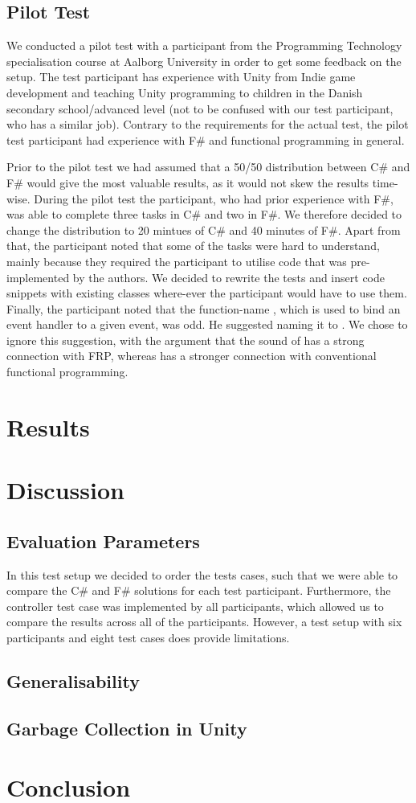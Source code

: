 \subsection{Pilot Test}
We conducted a pilot test with a participant from the Programming Technology specialisation course at Aalborg University in order to get some feedback on the setup. The test participant has experience with Unity from Indie game development and teaching Unity programming to children in the Danish secondary school/advanced level (not to be confused with our test participant, who has a similar job). Contrary to the requirements for the actual test, the pilot test participant had experience with F\# and functional programming in general.

Prior to the pilot test we had assumed that a 50/50 distribution between C\# and F\# would give the most valuable results, as it would not skew the results time-wise. During the pilot test the participant, who had prior experience with F\#, was able to complete three tasks in C\# and two in F\#. We therefore decided to change the distribution to 20 mintues of C\# and 40 minutes of F\#. Apart from that, the participant noted that some of the tasks were hard to understand, mainly because they required the participant to utilise code that was pre-implemented by the authors. We decided to rewrite the tests and insert code snippets with existing classes where-ever the participant would have to use them. Finally, the participant noted that the function-name , which is used to bind an event handler to a given event, was odd. He suggested naming it to . We chose to ignore this suggestion, with the argument that the sound of  has a strong connection with \gls{FRP}, whereas  has a stronger connection with conventional functional programming.

\section{Results}

\section{Discussion}

\subsection{Evaluation Parameters}
In this test setup we decided to order the tests cases, such that we were able to compare the C\# and F\# solutions for each test participant. Furthermore, the controller test case was implemented by all participants, which allowed us to compare the results across all of the participants. However, a test setup with six participants and eight test cases does provide limitations. 

\subsection{Generalisability}

\subsection{Garbage Collection in Unity}

\section{Conclusion}